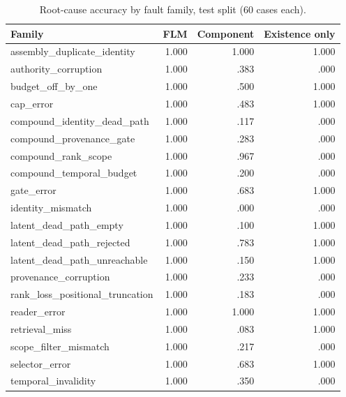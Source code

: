 \documentclass[10pt]{article}
\begin{document}
\begin{table}[h]
\centering
\caption{Root-cause accuracy by fault family, test split (60 cases each).}
\label{tab:families}
\begin{tabular}{lrrr}
\toprule
Family & FLM & Component & Existence only \\
\midrule
assembly\_duplicate\_identity & 1.000 & 1.000 & 1.000 \\
authority\_corruption & 1.000 & .383 & .000 \\
budget\_off\_by\_one & 1.000 & .500 & 1.000 \\
cap\_error & 1.000 & .483 & 1.000 \\
compound\_identity\_dead\_path & 1.000 & .117 & .000 \\
compound\_provenance\_gate & 1.000 & .283 & .000 \\
compound\_rank\_scope & 1.000 & .967 & .000 \\
compound\_temporal\_budget & 1.000 & .200 & .000 \\
gate\_error & 1.000 & .683 & 1.000 \\
identity\_mismatch & 1.000 & .000 & .000 \\
latent\_dead\_path\_empty & 1.000 & .100 & 1.000 \\
latent\_dead\_path\_rejected & 1.000 & .783 & 1.000 \\
latent\_dead\_path\_unreachable & 1.000 & .150 & 1.000 \\
provenance\_corruption & 1.000 & .233 & .000 \\
rank\_loss\_positional\_truncation & 1.000 & .183 & .000 \\
reader\_error & 1.000 & 1.000 & 1.000 \\
retrieval\_miss & 1.000 & .083 & 1.000 \\
scope\_filter\_mismatch & 1.000 & .217 & .000 \\
selector\_error & 1.000 & .683 & 1.000 \\
temporal\_invalidity & 1.000 & .350 & .000 \\
\bottomrule
\end{tabular}
\end{table}



\end{document}
